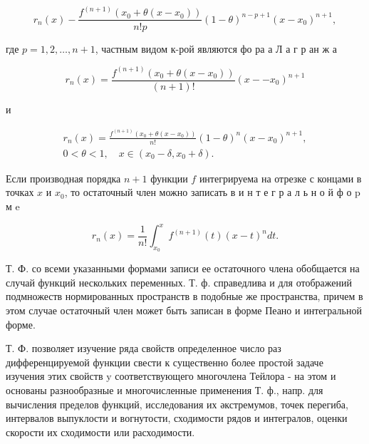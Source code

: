 \documentclass[10pt]{article}
\begin{document}
\[

r_{n}(x)-\frac{f^{(n+1)}\left(x_{0}+\theta\left(x-x_{0}\right)\right)}{n ! p}(1-\theta)^{n-p+1}\left(x-x_{0}\right)^{n+1},

\]



где $p=1,2, \ldots, n+1$, частным видом к-рой являются фо ра а Л а г р ан ж а



\[

r_{n}(x)=\frac{f^{(n+1)}\left(x_{0}+\theta\left(x-x_{0}\right)\right)}{(n+1) !}\left(x--x_{0}\right)^{n+1}

\]



и



\[

\begin{gathered}

r_{n}(x)=\frac{f^{(n+1)}\left(x_{0}+\theta\left(x-x_{0}\right)\right)}{n !}(1-\theta)^{n}\left(x-x_{0}\right)^{n+1}, \\

0<\theta<1, \quad x \in\left(x_{0}-\delta, x_{0}+\delta\right) .

\end{gathered}

\]



Если производная порядка $n+1$ функции $f$ интегрируема на отрезке с концами в точках $x$ и $x_{0}$, то остаточный член можно записать в и н т е г р а л ь н о й ф о p м e



\[

r_{n}(x)=\frac{1}{n !} \int_{x_{0}}^{x} f^{(n+1)}(t)(x-t)^{n} d t .

\]



Т. Ф. со всеми указанными формами записи ее остаточного члена обобщается на случай функций нескольких переменных. Т. ф. справедлива и для отображений подмножеств нормированных пространств в подобные же пространства, причем в этом случае остаточный член может быть записан в форме Пеано и интегральной форме.



Т. Ф. позволяет изучение ряда свойств определенное число раз дифференцируемой функции свести к существенно более простой задаче изучения этих свойств $\mathrm{y}$ соответствующего многочлена Тейлора - на этом и основаны разнообразные и многочисленные применения Т. ф., напр. для вычисления пределов функций, исследования их әкстремумов, точек перегиба, интервалов выпуклости и вогнутости, сходимости рядов и интегралов, оценки скорости их сходимости или расходимости.
\end{document}
